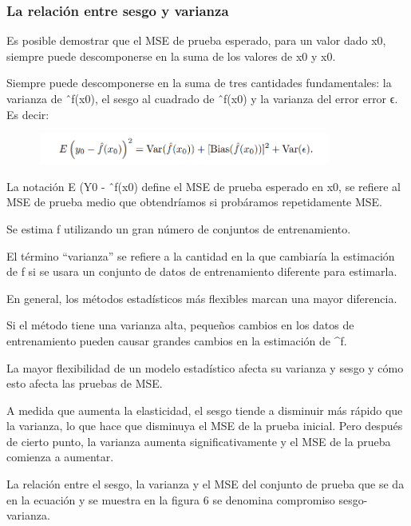 \documentclass[
  letterpaper,
  DIV=11,
  numbers=noendperiod]{scrartcl}
\begin{document}
\hypertarget{la-relaciuxf3n-entre-sesgo-y-varianza}{%
\subsubsection{\texorpdfstring{\textbf{La relación entre sesgo y
varianza}}{La relación entre sesgo y varianza}}\label{la-relaciuxf3n-entre-sesgo-y-varianza}}

Es posible demostrar que el MSE de prueba esperado, para un valor dado
x0, siempre puede descomponerse en la suma de los valores de x0 y x0.

Siempre puede descomponerse en la suma de tres cantidades fundamentales:
la varianza de ˆf(x0), el sesgo al cuadrado de ˆf(x0) y la varianza del
error error ϵ. Es decir:

\begin{figure}

{\centering \includegraphics[width=3.82292in,height=0.39583in]{images/figura5.png}

}

\end{figure}

La notación E (Y0 - ˆf(x0) define el MSE de prueba esperado en x0, se
refiere al MSE de prueba medio que obtendríamos si probáramos
repetidamente MSE.

Se estima f utilizando un gran número de conjuntos de entrenamiento.

El término ``varianza'' se refiere a la cantidad en la que cambiaría la
estimación de f si se usara un conjunto de datos de entrenamiento
diferente para estimarla.

En general, los métodos estadísticos más flexibles marcan una mayor
diferencia.

Si el método tiene una varianza alta, pequeños cambios en los datos de
entrenamiento pueden causar grandes cambios en la estimación de \^{}f.

La mayor flexibilidad de un modelo estadístico afecta su varianza y
sesgo y cómo esto afecta las pruebas de MSE.

A medida que aumenta la elasticidad, el sesgo tiende a disminuir más
rápido que la varianza, lo que hace que disminuya el MSE de la prueba
inicial. Pero después de cierto punto, la varianza aumenta
significativamente y el MSE de la prueba comienza a aumentar.

La relación entre el sesgo, la varianza y el MSE del conjunto de prueba
que se da en la ecuación y se muestra en la figura 6 se denomina
compromiso sesgo-varianza.
\end{document}
